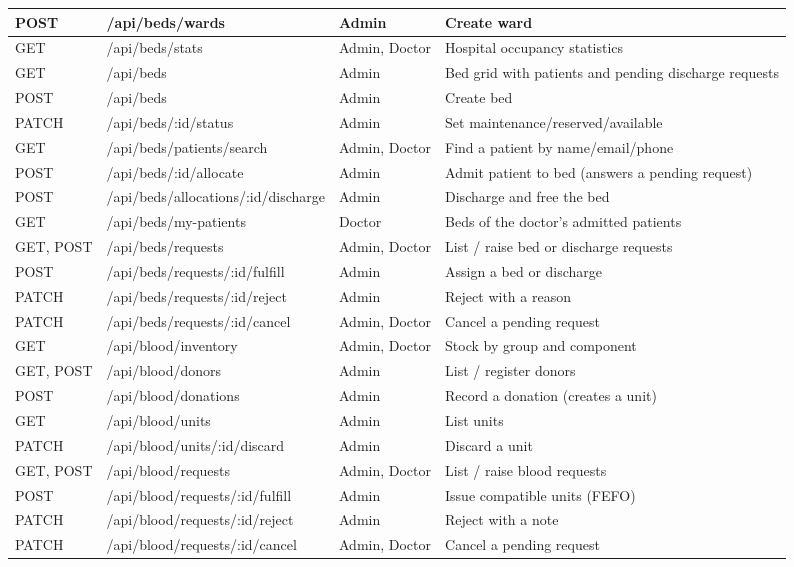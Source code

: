 \begin{longtable}{|L{1.9cm}|L{5.4cm}|L{2.1cm}|L{3.8cm}|}
\hline
POST & /api/beds/wards & Admin & Create ward \\
\hline
GET & /api/beds/stats & Admin, Doctor & Hospital occupancy statistics \\
\hline
GET & /api/beds & Admin & Bed grid with patients and pending discharge requests \\
\hline
POST & /api/beds & Admin & Create bed \\
\hline
PATCH & /api/beds/:id/status & Admin & Set maintenance/reserved/available \\
\hline
GET & /api/beds/patients/search & Admin, Doctor & Find a patient by name/email/phone \\
\hline
POST & /api/beds/:id/allocate & Admin & Admit patient to bed (answers a pending request) \\
\hline
POST & /api/beds/allocations/:id/discharge & Admin & Discharge and free the bed \\
\hline
GET & /api/beds/my-patients & Doctor & Beds of the doctor's admitted patients \\
\hline
GET, POST & /api/beds/requests & Admin, Doctor & List / raise bed or discharge requests \\
\hline
POST & /api/beds/requests/:id/fulfill & Admin & Assign a bed or discharge \\
\hline
PATCH & /api/beds/requests/:id/reject & Admin & Reject with a reason \\
\hline
PATCH & /api/beds/requests/:id/cancel & Admin, Doctor & Cancel a pending request \\
\hline
GET & /api/blood/inventory & Admin, Doctor & Stock by group and component \\
\hline
GET, POST & /api/blood/donors & Admin & List / register donors \\
\hline
POST & /api/blood/donations & Admin & Record a donation (creates a unit) \\
\hline
GET & /api/blood/units & Admin & List units \\
\hline
PATCH & /api/blood/units/:id/discard & Admin & Discard a unit \\
\hline
GET, POST & /api/blood/requests & Admin, Doctor & List / raise blood requests \\
\hline
POST & /api/blood/requests/:id/fulfill & Admin & Issue compatible units (FEFO) \\
\hline
PATCH & /api/blood/requests/:id/reject & Admin & Reject with a note \\
\hline
PATCH & /api/blood/requests/:id/cancel & Admin, Doctor & Cancel a pending request \\

\end{longtable}
